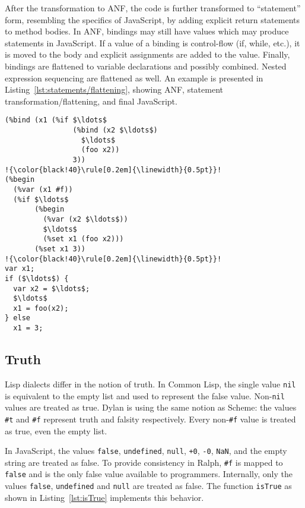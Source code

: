 \documentclass{acm_proc_article-sp}
\begin{document}
After the transformation to ANF, the code is further transformed to
``statement'' form, resembling the specifics of JavaScript, by adding
explicit return statements to method bodies. In ANF, bindings may
still have values which may produce statements in JavaScript. If a
value of a binding is control-flow (if, while, etc.), it is moved
to the body and explicit assignments are added to the value. Finally,
bindings are flattened to variable declarations and possibly combined.
Nested expression sequencing are flattened as well. An example is
presented in Listing~\ref{lst:statements/flattening}, showing ANF,
statement transformation/flattening, and final JavaScript.

\begin{lstlisting}[escapechar=!,
    label=lst:statements/flattening,
    caption=\sloppy\mbox{Transformation to statements and flattening}
]
(%bind (x1 (%if $\ldots$
                (%bind (x2 $\ldots$)
                  $\ldots$
                  (foo x2))
                3))
!{\color{black!40}\rule[0.2em]{\linewidth}{0.5pt}}!
(%begin
  (%var (x1 #f))
  (%if $\ldots$
       (%begin
         (%var (x2 $\ldots$))
         $\ldots$
         (%set x1 (foo x2)))
       (%set x1 3))
!{\color{black!40}\rule[0.2em]{\linewidth}{0.5pt}}!
var x1;
if ($\ldots$) {
  var x2 = $\ldots$;
  $\ldots$
  x1 = foo(x2);
} else
  x1 = 3;
\end{lstlisting}



\subsection{Truth}

Lisp dialects differ in the notion of truth. In Common Lisp, the
single value \texttt{nil} is equivalent to the empty list and used to
represent the false value. Non-\texttt{nil} values are treated as
true. Dylan is using the same notion as Scheme: the values
\texttt{\#t} and \texttt{\#f} represent truth and falsity respectively.
Every non-\texttt{\#f} value is treated as true, even the empty list.

In JavaScript, the values \texttt{false}, \texttt{undefined},
\texttt{null}, \texttt{+0}, \texttt{-0}, \texttt{NaN}, and the empty
string are treated as false. To provide consistency in Ralph,
\texttt{\#f} is mapped to \texttt{false} and is the only false value
available to programmers. Internally, only the values \texttt{false},
\texttt{undefined} and \texttt{null} are treated as false. The
function \texttt{isTrue} as shown in Listing~\ref{lst:isTrue}
implements this behavior.
\end{document}
